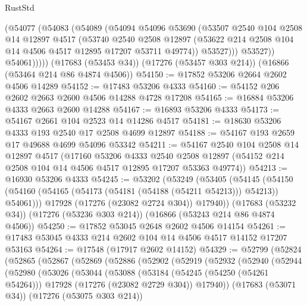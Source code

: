 \begin{lexlean}{RustStd}
\begin{coremodule}
              (@54077
                (@54083
                  (@54089
                    (@54094
                      @54096
                      @53690
                      (@53507
                        @2540
                        @104
                        @2508
                        @14
                        @12897
                        @4517
                        (@53740
                          @2540
                          @2508
                          @12897
                          (@53622 @214 @2508 @104 @14 @4506 @4517 @12895 @17207 @53711 @49774))
                        @53527)))
                  @53527))
              @54061)))))
    (@17683 (@53453 @34))
    (@17276 (@53457 @303 @214))
    (@16866 (@53464 @214 @86 @4874 @4506))
@54150 := @17852 @53206 @2664 @2602 @4506 @14289
@54152 := @17483 @53206 @4333
@54160 := @54152 @206 @2602 @2663 @2600 @4506 @14288 @4728 @17208
@54165 := @16884 @53206 @4333 @2663 @2600 @14288
@54167 := @16893 @53206 @4333
@54173 := @54167 @2661 @104 @2523 @14 @14286 @4517
@54181 := @18630 @53206 @4333 @193 @2540 @17 @2508 @4699 @12897
@54188 := @54167 @193 @2659 @17 @49688 @4699 @54096 @53342
@54211 := @54167
    @2540
    @104
    @2508
    @14
    @12897
    @4517
    (@17160
      @53206
      @4333
      @2540
      @2508
      @12897
      (@54152 @214 @2508 @104 @14 @4506 @4517 @12895 @17207 @53363 @49774))
@54213 := @16930 @53206 @4333
@54245 := @53202
    (@53249
      (@53405
        (@54145 (@54150 (@54160 (@54165 (@54173 (@54181 (@54188 (@54211 @54213))) @54213)) @54061)))
        @17928
        (@17276 (@23082 @2724 @304))
        @17940))
    (@17683 (@53232 @34))
    (@17276 (@53236 @303 @214))
    (@16866 (@53243 @214 @86 @4874 @4506))
@54250 := @17852 @53045 @2648 @2602 @4506 @14154
@54261 := @17483 @53045 @4333 @214 @2602 @104 @14 @4506 @4517 @14152 @17207 @53163
@54264 := @17548 (@17917 @2602 @14152)
@54329 := @52799
    (@52824
      (@52865
        (@52867
          (@52869
            (@52886
              (@52902
                (@52919
                  (@52932
                    (@52940
                      (@52944
                        (@52980
                          (@53026
                            (@53044
                              (@53088
                                (@53184
                                  (@54245 (@54250 (@54261 @54264)))
                                  @17928
                                  (@17276 (@23082 @2729 @304))
                                  @17940))
                              (@17683 (@53071 @34))
                              (@17276 (@53075 @303 @214))

\end{coremodule}
\end{lexlean}
